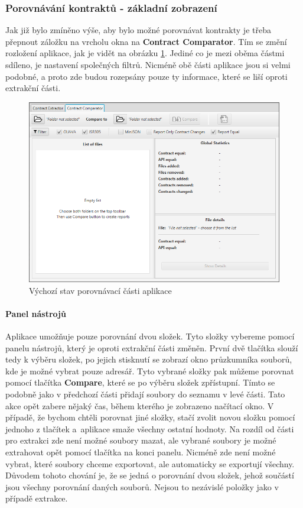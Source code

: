 	
	\subsubsection{Porovnávání kontraktů - základní zobrazení}
		Jak již bylo zmíněno výše, aby bylo možné porovnávat kontrakty je třeba přepnout záložku na vrcholu okna na \textbf{Contract Comparator}. Tím se změní rozložení aplikace, jak je vidět na obrázku \ref{guide06}. Jediné co je mezi oběma částmi sdíleno, je nastavení společných filtrů. Nicméně obě části aplikace jsou si velmi podobné, a proto zde budou rozepsány pouze ty informace, které se liší oproti extrakční části.
		
			\begin{figure}[!htb]
					\centering
					\includegraphics[width=1\textwidth]{img/guide06.png}
					\caption[guide06]{Výchozí stav porovnávací části aplikace}
					\label{guide06}
				\endminipage\hfill
			\end{figure}
		
		\paragraph{Panel nástrojů}	
			Aplikace umožňuje pouze porovnání dvou složek. Tyto složky vybereme pomocí panelu nástrojů, který je oproti extrakční části změněn. První dvě tlačítka slouží tedy k výběru složek, po jejich stisknutí se zobrazí okno průzkumníka souborů, kde je možné vybrat pouze adresář. Tyto vybrané složky pak můžeme porovnat pomocí tlačítka \textbf{Compare}, které se po výběru složek zpřístupní. Tímto se podobně jako v předchozí části přidají soubory do seznamu v levé části. Tato akce opět zabere nějaký čas, během kterého je zobrazeno načítací okno. V případě, že bychom chtěli porovnat jiné složky, stačí zvolit novou složku pomocí jednoho z tlačítek a~aplikace smaže všechny ostatní hodnoty. Na rozdíl od části pro extrakci zde není možné soubory mazat, ale vybrané soubory je možné extrahovat opět pomocí tlačítka na konci panelu. Nicméně zde není možné vybrat, které soubory chceme exportovat, ale automaticky se exportují všechny. Důvodem tohoto chování je, že se jedná o porovnání dvou složek, jehož součástí jsou všechny porovnání daných souborů. Nejsou to nezávislé položky jako v případě extrakce.\\
		
